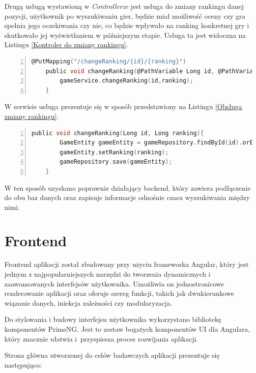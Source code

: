 Drugą usługą wystawioną w \textit{Controllerze} jest usługa do zmiany rankingu danej pozycji, użytkownik po wyszukiwaniu gier, będzie miał możliwość oceny czy gra spełnia jego oczekiwania czy nie, co będzie wpływało na ranking konkretnej gry i skutkowało jej wyświetlaniem w późniejszym etapie. Usługa ta jest widoczna na Listingu \ref{Kontroler do zmiany rankingu}.
\begin{lstlisting}[language=C, mathescape, frame=single, numbers=left, xleftmargin=2em, framexleftmargin=2em, basicstyle=\ttfamily\bfseries, caption={Kontroler do zmiany rankingu}, label={Kontroler do zmiany rankingu}]
    @PutMapping("/changeRanking/{id}/{ranking}")
    public void changeRanking(@PathVariable Long id, @PathVariable Long ranking){
        gameService.changeRanking(id,ranking);
    }
\end{lstlisting}
W serwisie usługa prezentuje się w sposób przedstawiony na Listingu \ref{Obsługa zmiany rankingu}.
\begin{lstlisting}[language=C, mathescape, frame=single, numbers=left, xleftmargin=2em, framexleftmargin=2em, basicstyle=\ttfamily\bfseries, caption={Obsługa zmiany rankingu}, label={Obsługa zmiany rankingu}]
    public void changeRanking(Long id, Long ranking){
        GameEntity gameEntity = gameRepository.findById(id).orElseThrow(() -> new RuntimeException("Nie znaleziono gry o podanym id"));
        gameEntity.setRanking(ranking);
        gameRepository.save(gameEntity);
    }
\end{lstlisting}
W ten sposób uzyskano poprawnie działający backend, który zawiera podłączenie do obu baz danych oraz zapisuje informacje odnośnie czasu wyszukiwania między nimi.

\section{Frontend}
Frontend aplikacji został zbudowany przy użyciu frameworka Angular, który jest jednym z najpopularniejszych narzędzi do tworzenia dynamicznych i zaawansowanych interfejsów użytkownika. Umożliwia on jednostronicowe renderowanie aplikacji oraz oferuje szereg funkcji, takich jak dwukierunkowe wiązanie danych, iniekcja zależności czy modularyzacja.

Do stylowania i budowy interfejsu użytkownika wykorzystano bibliotekę komponentów PrimeNG. Jest to zestaw bogatych komponentów UI dla Angulara, który znacznie ułatwia i~przyspiesza proces rozwijania aplikacji.

Strona główna utworzonej do celów badawczych aplikacji prezentuje się następująco:

